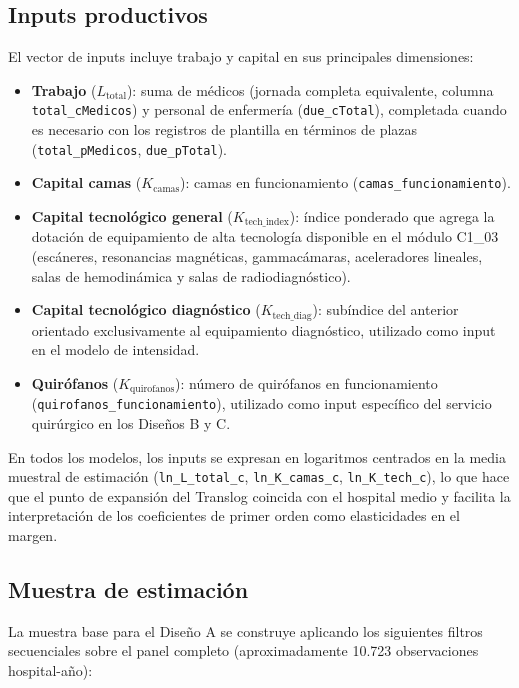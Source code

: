 \subsection{Inputs productivos}
\label{subsec:inputs}

El vector de inputs incluye trabajo y capital en sus principales dimensiones:

\begin{itemize}
  \item \textbf{Trabajo} (\(L_{\text{total}}\)): suma de médicos (jornada completa equivalente, columna \texttt{total\_cMedicos}) y personal de enfermería (\texttt{due\_cTotal}), completada cuando es necesario con los registros de plantilla en términos de plazas (\texttt{total\_pMedicos}, \texttt{due\_pTotal}).
  \item \textbf{Capital camas} (\(K_{\text{camas}}\)): camas en funcionamiento (\texttt{camas\_funcionamiento}).
  \item \textbf{Capital tecnológico general} (\(K_{\text{tech\_index}}\)): índice ponderado que agrega la dotación de equipamiento de alta tecnología disponible en el módulo C1\_03 (escáneres, resonancias magnéticas, gammacámaras, aceleradores lineales, salas de hemodinámica y salas de radiodiagnóstico).
  \item \textbf{Capital tecnológico diagnóstico} (\(K_{\text{tech\_diag}}\)): subíndice del anterior orientado exclusivamente al equipamiento diagnóstico, utilizado como input en el modelo de intensidad.
  \item \textbf{Quirófanos} (\(K_{\text{quirofanos}}\)): número de quirófanos en funcionamiento (\texttt{quirofanos\_funcionamiento}), utilizado como input específico del servicio quirúrgico en los Diseños B y C.
\end{itemize}

En todos los modelos, los inputs se expresan en logaritmos centrados en la media muestral de estimación (\texttt{ln\_L\_total\_c}, \texttt{ln\_K\_camas\_c}, \texttt{ln\_K\_tech\_c}), lo que hace que el punto de expansión del Translog coincida con el hospital medio y facilita la interpretación de los coeficientes de primer orden como elasticidades en el margen.

\subsection{Muestra de estimación}
\label{subsec:muestra}

La muestra base para el Diseño A se construye aplicando los siguientes filtros secuenciales sobre el panel completo (aproximadamente 10.723 observaciones hospital-año):

